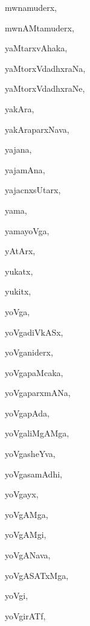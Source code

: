 \begin{multicols}{3}
{\noindent
{mwnamuderx}, \pageref{mwnamuderx}

\noindent
{mwnAMtamuderx}, \pageref{mwnAMtamuderx}

\noindent
{yaMtarxvAhaka}, \pageref{yaMtarxvAhaka}

\noindent
{yaMtorxVdadhxraNa}, \pageref{yaMtorxVdadhxraNa}

\noindent
{yaMtorxVdadhxraNe}, \pageref{yaMtorxVdadhxraNe}

\noindent
{yakAra}, \pageref{yakAra}

\noindent
{yakAraparxNava}, \pageref{yakAraparxNava}

\noindent
{yajana}, \pageref{yajana}

\noindent
{yajamAna}, \pageref{yajamAna}

\noindent
{yajacnxsUtarx}, \pageref{yajacnxsUtarx}

\noindent
{yama}, \pageref{yama}

\noindent
{yamayoVga}, \pageref{yamayoVga}

\noindent
{yAtArx}, \pageref{yAtArx}

\noindent
{yukatx}, \pageref{yukatx}

\noindent
{yukitx}, \pageref{yukitx}

\noindent
{yoVga}, \pageref{yoVga}

\noindent
{yoVgadiVkASx}, \pageref{yoVgadiVkASx}

\noindent
{yoVganiderx}, \pageref{yoVganiderx}

\noindent
{yoVgapaMcaka}, \pageref{yoVgapaMcaka}

\noindent
{yoVgaparxmANa}, \pageref{yoVgaparxmANa}

\noindent
{yoVgapAda}, \pageref{yoVgapAda}

\noindent
{yoVgaliMgAMga}, \pageref{yoVgaliMgAMga}

\noindent
{yoVgasheYva}, \pageref{yoVgasheYva}

\noindent
{yoVgasamAdhi}, \pageref{yoVgasamAdhi}

\noindent
{yoVgayx}, \pageref{yoVgayx}

\noindent
{yoVgAMga}, \pageref{yoVgAMga}

\noindent
{yoVgAMgi}, \pageref{yoVgAMgi}

\noindent
{yoVgANava}, \pageref{yoVgANava}

\noindent
{yoVgASATxMga}, \pageref{yoVgASATxMga}

\noindent
{yoVgi}, \pageref{yoVgi}

\noindent
{yoVgirATf}, \pageref{yoVgirATf}

}
\end{multicols}
